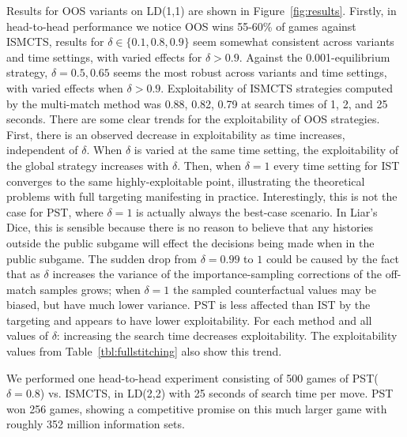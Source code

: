 \documentclass[letterpaper]{article}
\begin{document}
Results for OOS variants on LD(1,1) are shown in Figure~\ref{fig:results}. Firstly, in head-to-head performance 
we notice OOS wins 55-60\% of games against ISMCTS, results for $\delta \in \{ 0.1, 0.8, 0.9 \}$ seem somewhat 
consistent across variants and time settings, with varied effects for $\delta > 0.9$. 
Against the 0.001-equilibrium strategy, 
$\delta = 0.5, 0.65$ seems the most robust across variants and time settings, with varied effects when $\delta > 0.9$.
Exploitability of ISMCTS strategies computed by the multi-match method was 0.88, 0.82, 0.79 at search times of 
1, 2, and 25 seconds. There are some clear trends for the exploitability of OOS strategies. 
First, there is an observed decrease in exploitability as time increases, independent of $\delta$. 
When $\delta$ is varied at the same time setting, the exploitability of the global strategy increases with $\delta$. 
Then, when $\delta = 1$ every time setting for IST converges to the same highly-exploitable point, illustrating the 
theoretical problems with full targeting manifesting in practice. 
Interestingly, this is not the case for PST, where $\delta = 1$ is actually always the best-case scenario. 
In Liar's Dice, this is sensible because there is no reason to believe that any histories outside the public subgame 
will effect the decisions being made when in the public subgame. 
The sudden drop from $\delta = 0.99$ to $1$ could be caused by the fact that as $\delta$ increases the 
variance of the importance-sampling corrections of the off-match samples grows; when $\delta = 1$ the 
sampled counterfactual values may be biased, but have much lower variance. 
PST is less affected than IST by the targeting and appears to have lower exploitability. 
For each method and all values of $\delta$: increasing the search time decreases exploitability. 
The exploitability values from Table~\ref{tbl:fullstitching} also show this trend. 

We performed one head-to-head experiment consisting of 500 games of PST($\delta = 0.8$) vs. ISMCTS, in LD(2,2)
with 25 seconds of search time per move. 
PST won 256 games, showing a competitive promise on 
this much larger game with roughly 352 million information sets. 

\end{document}
